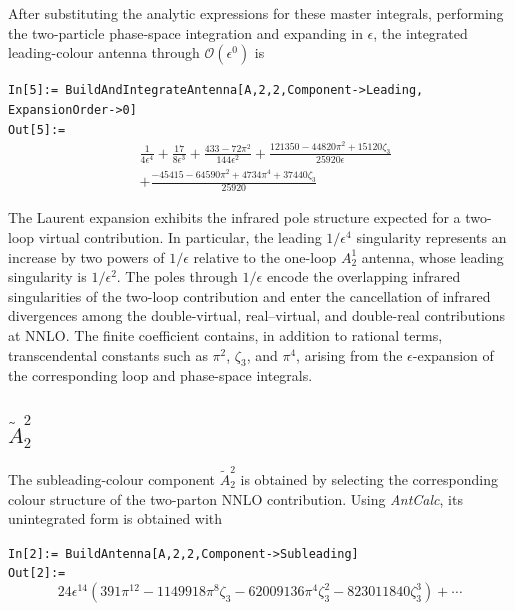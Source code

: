 After substituting the analytic expressions for these master integrals, performing the two-particle
phase-space integration and expanding in $\epsilon$, the integrated leading-colour antenna through
$\mathcal O(\epsilon^0)$ is

\begin{mdframed}[backgroundcolor=gray!10, linewidth=0pt]
\texttt{In[5]:= BuildAndIntegrateAntenna[A,2,2,Component->Leading,\\ExpansionOrder->0]}\\
\hfill
\texttt{Out[5]:=}
    \begin{equation*}
        \begin{split}
            &\frac1{4\epsilon^4}+\frac{17}{8\epsilon^3}+\frac{433-72\pi^2}{144\epsilon^2}+\frac{121350-44820\pi^2+15120\zeta_3}{25920\epsilon}\\
            &+\frac{-45415-64590\pi^2+4734\pi^4+37440\zeta_3}{25920}
        \end{split}
    \end{equation*}
\end{mdframed}

The Laurent expansion exhibits the infrared pole structure expected for a two-loop virtual
contribution. In particular, the leading $1/\epsilon^4$ singularity represents an increase by two
powers of $1/\epsilon$ relative to the one-loop $A_2^1$ antenna, whose leading singularity is
$1/\epsilon^2$. The poles through $1/\epsilon$ encode the overlapping infrared singularities of the
two-loop contribution and enter the cancellation of infrared divergences among the double-virtual,
real--virtual, and double-real contributions at NNLO. The finite coefficient contains, in addition to
rational terms, transcendental constants such as $\pi^2$, $\zeta_3$, and $\pi^4$, arising from the
$\epsilon$-expansion of the corresponding loop and phase-space integrals.

\subsection{$\tilde A_2^2$}

The subleading-colour component $\tilde A_2^2$ is obtained by selecting the corresponding colour
structure of the two-parton NNLO contribution. Using \textit{AntCalc}, its unintegrated form is
obtained with

\begin{mdframed}[backgroundcolor=gray!10, linewidth=0pt]
\texttt{In[2]:= BuildAntenna[A,2,2,Component->Subleading]}\\
\hfill
\texttt{Out[2]:=}
    \begin{equation*}
        24\epsilon^{14}\!\left(391\pi^{12}-1149918\pi^8\zeta_3-62009136\pi^4\zeta_3^2-823011840\zeta_3^3\right)+\cdots
    \end{equation*}
\end{mdframed}

